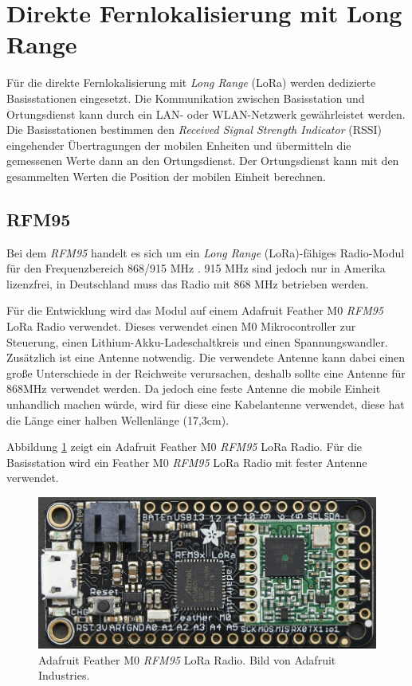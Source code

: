 \section{Direkte Fernlokalisierung mit Long Range}
\label{ch:phase4}
Für die direkte Fernlokalisierung mit \emph{Long Range} (LoRa) werden dedizierte Basisstationen eingesetzt. 
Die Kommunikation zwischen Basisstation und Ortungsdienst kann durch ein LAN- oder WLAN-Netzwerk gewährleistet werden.
Die Basisstationen bestimmen den \emph{Received Signal Strength Indicator} (RSSI) eingehender Übertragungen der mobilen Enheiten und übermitteln die gemessenen Werte dann an den Ortungsdienst.
Der Ortungsdienst kann mit den gesammelten Werten die Position der mobilen Einheit berechnen.

\subsection{RFM95}
\label{ch:hardwarechanges:sec:rfm95}
Bei dem \emph{RFM95} handelt es sich um ein \emph{Long Range} (LoRa)-fähiges Radio-Modul für den Frequenzbereich 868/915 MHz \cite{hope2006rfm}. 
915 MHz sind jedoch nur in Amerika lizenzfrei, in Deutschland muss das Radio mit 868 MHz betrieben werden.

Für die Entwicklung wird das Modul auf einem Adafruit Feather M0 \emph{RFM95} LoRa Radio verwendet.
Dieses verwendet einen M0 Mikrocontroller zur Steuerung, einen Lithium-Akku-Ladeschaltkreis und einen Spannungswandler.
Zusätzlich ist eine Antenne notwendig. 
Die verwendete Antenne kann dabei einen große Unterschiede in der Reichweite verursachen, deshalb sollte eine Antenne für 868MHz verwendet werden.
Da jedoch eine feste Antenne die mobile Einheit unhandlich machen würde, wird für diese eine Kabelantenne verwendet, diese hat die Länge einer halben Wellenlänge (17,3cm).

Abbildung \ref{fig:lorafeather} zeigt ein Adafruit Feather M0 \emph{RFM95} LoRa Radio. 
Für die Basisstation wird ein Feather M0 \emph{RFM95} LoRa Radio mit fester Antenne verwendet.

\begin{figure}[h]
  \centering
	\includegraphics[width=\textwidth]{images/loraada.png}
  \caption{Adafruit Feather M0 \emph{RFM95} LoRa Radio. Bild von Adafruit Industries\protect \footnotemark.}
  \label{fig:lorafeather}
\end{figure}


